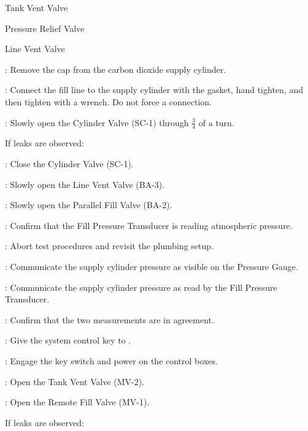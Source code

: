 \begin{checklist}
    	\begin{checklist}
    		\item Tank Vent Valve
    		\item Pressure Relief Valve
    		\item Line Vent Valve
    	\end{checklist}
    	\item \primary{}: Remove the cap from the carbon dioxide supply cylinder. 
    	\item \primary{}: Connect the fill line to the supply cylinder with the gasket, hand tighten, and then tighten with a wrench. Do not force a connection. 
    	\item \primary{}: Slowly open the Cylinder Valve (SC-1) through $\frac{3}{4}$ of a turn. 
    	\begin{checklist}[label=$\bullet$]
    		\item If leaks are observed:
    		\begin{checklist}
    			\item \primary{}: Close the Cylinder Valve (SC-1). 
    			\item \primary{}: Slowly open the Line Vent Valve (BA-3). 
    			\item \primary{}: Slowly open the Parallel Fill Valve (BA-2).
    			\item \daq{}: Confirm that the Fill Pressure Transducer is reading atmospheric pressure. 
    			\item \ops{}: Abort test procedures and revisit the plumbing setup.
    		\end{checklist}
    	\end{checklist}
    	\item \primary{}: Communicate the supply cylinder pressure as visible on the Pressure Gauge. 
    	\item \daq{}: Communicate the supply cylinder pressure as read by the Fill Pressure Transducer. 
    	\item \daq{}: Confirm that the two measurements are in agreement. 
    	\item \ops{}: Give the system control key to \control{}.
    	\item \control{}: Engage the key switch and power on the control boxes. 
    	\item \control{}: Open the Tank Vent Valve (MV-2). 
    	\item \control{}: Open the Remote Fill Valve (MV-1). 
    	\begin{checklist}[label=$\bullet$]
    		\item If leaks are observed:

\end{checklist}
\end{checklist}
